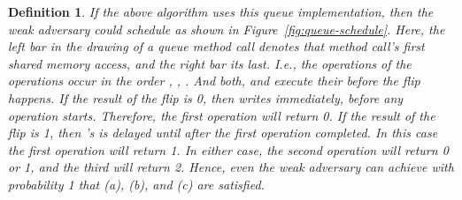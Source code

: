\documentclass[11pt,letterpaper]{article}
\newcommand{\xwrite}{\text{\tt write}\xspace}
\newcommand{\fetchInc}{\text{\tt fetch\&inc}\xspace}
\newtheorem{definition}[theorem]{Definition}
\begin{document}
\begin{definition}
If the above algorithm uses this queue implementation, then the weak adversary could schedule as shown in Figure~\ref{fig:queue-schedule}.
Here, the left bar in the drawing of a queue method call denotes that method call's first shared memory access, and the right bar its last.
I.e., the \fetchInc operations of the \Enqueue operations occur in the order , , .
And both,  and  execute their  before the flip happens.
If the result of the flip is 0, then  writes immediately, before any \Dequeue operation starts.
Therefore, the first \Dequeue operation will return 0.
If the result of the flip is 1, then 's \xwrite is delayed until after the first \Dequeue operation completed.
In this case the first \Dequeue operation will return 1.
In either case, the second \Dequeue operation will return 0 or 1, and the third will return 2.
Hence, even the weak adversary can achieve with probability 1 that (a), (b), and (c) are satisfied.
\begin{figure}[bt]
\end{figure}
\end{definition}
\end{document}
